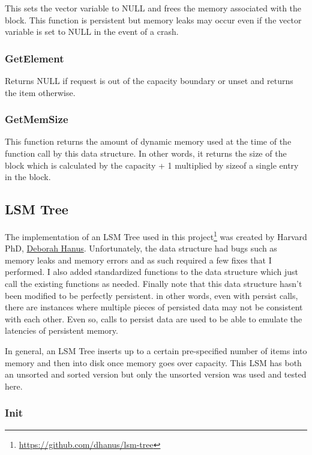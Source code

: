 \documentclass[twocolumn]{article}
\begin{document}
This sets the vector variable to NULL and frees the memory associated with the
block. This function is persistent but memory leaks may occur even if the vector
variable is set to NULL in the event of a crash.

\subsubsection{GetElement}

Returns NULL if request is out of the capacity boundary or unset and returns the
item otherwise.

\subsubsection{GetMemSize}

This function returns the amount of dynamic memory used at the time of the
function call by this data structure. In other words, it returns the size of the
block which is calculated by the capacity + 1 multiplied by sizeof a single
entry in the block.

\subsection{LSM Tree}

The implementation of an LSM Tree used in this
project\footnote{\url{https://github.com/dhanus/lsm-tree}} was created by
Harvard PhD, \href{https://dhanus.github.io/}{Deborah Hanus}. Unfortunately, the
data structure had bugs such as memory leaks and memory errors and as such
required a few fixes that I performed. I also added standardized functions to
the data structure which just call the existing functions as needed. Finally
note that this data structure hasn't been modified to be perfectly persistent.
in other words, even with persist calls, there are instances where multiple
pieces of persisted data may not be consistent with each other. Even so, calls
to persist data are used to be able to emulate the latencies of persistent
memory.

In general, an LSM Tree \cite{THE LSM PAPER} inserts up to a certain
pre-specified number of items into memory and then into disk once memory goes
over capacity. This LSM has both an unsorted and sorted version but only the
unsorted version was used and tested here.

\subsubsection{Init}
\end{document}
